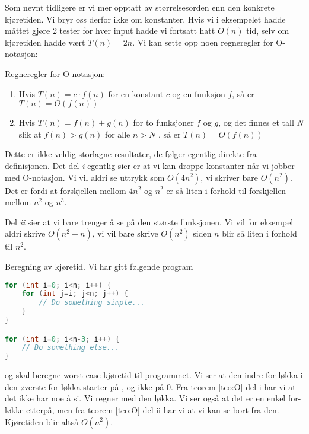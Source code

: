 Som nevnt tidligere er vi mer opptatt av størrelsesorden enn den konkrete kjøretiden. Vi bryr oss derfor ikke om konstanter. Hvis vi i eksempelet hadde måttet gjøre 2 tester for hver input hadde vi fortsatt hatt $ O(n) $ tid, selv om kjøretiden hadde vært $ T(n) = 2n $. Vi kan sette opp noen regneregler for O-notasjon:
\begin{theorem}
\label{teo:O}
Regneregler for O-notasjon:
\begin{enumerate}[i]
	\item Hvis $ T(n) = c\cdot f(n) $ for en konstant $ c $ og en funksjon $ f $, så er $ T(n) = O(f(n)) $
	\item Hvis $ T(n) = f(n) + g(n) $ for to funksjoner $ f $ og $ g $, og det finnes et tall $ N $ slik at $ f(n) > g(n) $ for alle $ n > N$ , så er $ T(n) = O(f(n)) $
\end{enumerate}
\end{theorem}

Dette er ikke veldig storlagne resultater, de følger egentlig direkte fra definisjonen. Det del \textit{i} egentlig sier er at vi kan droppe konstanter når vi jobber med O-notasjon. Vi vil aldri se uttrykk som $ O(4n^2) $, vi skriver bare $ O(n^2) $. Det er fordi at forskjellen mellom $ 4n^2 $ og $ n^2 $ er så liten i forhold til forskjellen mellom $ n^2 $ og $ n^3 $. 

Del \textit{ii} sier at vi bare trenger å se på den største funksjonen. Vi vil for eksempel aldri skrive $ O(n^2 + n) $, vi vil bare skrive $ O(n^2) $ siden $ n $ blir så liten i forhold til $ n^2 $.


\begin{example} Beregning av kjøretid. Vi har gitt følgende program
\begin{lstlisting}[language=Java,
commentstyle=\color{source_brown}\monofontitalic, 
morekeywords={String},
keywordstyle=\color{source_blue}\monofontbold,
stringstyle=\color{source_orange}]
for (int i=0; i<n; i++) {
    for (int j=i; j<n; j++) {
        // Do something simple...
    }
}

for (int i=0; i<n-3; i++) {
    // Do something else...
}
\end{lstlisting}
og skal beregne worst case kjøretid til programmet. Vi ser at den indre for-løkka i den øverste for-løkka starter på , og ikke på 0. Fra teorem \ref{teo:O} del i har vi at det ikke har noe å si. Vi regner med den løkka. Vi ser også at det er en enkel for-løkke etterpå, men fra teorem \ref{teo:O} del ii har vi at vi kan se bort fra den. Kjøretiden blir altså $ O(n^2) $.
\end{example}


